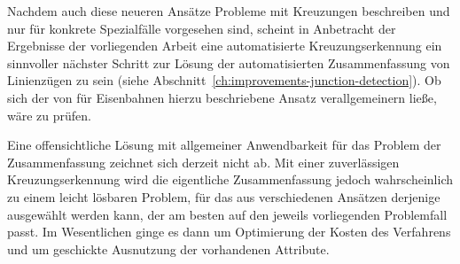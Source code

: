\documentclass[../main/thesis.tex]{subfiles}
\begin{document}
Nachdem auch diese neueren Ansätze Probleme mit Kreuzungen beschreiben und nur für konkrete Spezialfälle vorgesehen sind, scheint in Anbetracht der Ergebnisse der vorliegenden Arbeit eine automatisierte Kreuzungserkennung
ein sinnvoller nächster Schritt zur Lösung der automatisierten Zusammenfassung von Linienzügen zu sein (siehe Abschnitt~\ref{ch:improvements-junction-detection}).
Ob sich der von \citeauthor{CTGV14} für Eisenbahnen hierzu beschriebene Ansatz verallgemeinern ließe, wäre zu prüfen.

Eine offensichtliche Lösung mit allgemeiner Anwendbarkeit für das Problem der Zusammenfassung zeichnet sich derzeit nicht ab.
Mit einer zuverlässigen Kreuzungserkennung wird die eigentliche Zusammenfassung jedoch wahrscheinlich zu einem leicht lösbaren Problem, für das aus verschiedenen Ansätzen derjenige ausgewählt werden kann, der am besten auf den jeweils vorliegenden Problemfall passt.
Im Wesentlichen ginge es dann um Optimierung der Kosten des Verfahrens und um geschickte Ausnutzung der vorhandenen Attribute. 



\end{document}
